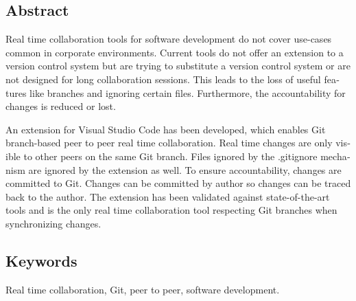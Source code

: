 
\begin{otherlanguage}{english}

  \chapter*{Abstract}

  Real time collaboration tools for software development do not cover use-cases common in corporate environments. Current tools do not offer an extension to a version control system but are trying to substitute a version control system or are not designed for long collaboration sessions. This leads to the loss of useful features like branches and ignoring certain files. Furthermore, the accountability for changes is reduced or lost.

  An extension for Visual Studio Code has been developed, which enables Git branch-based peer to peer real time collaboration. Real time changes are only visible to other peers on the same Git branch. Files ignored by the .gitignore mechanism are ignored by the extension as well. To ensure accountability, changes are committed to Git. Changes can be committed by author so changes can be traced back to the author. The extension has been validated against state-of-the-art tools and is the only real time collaboration tool respecting Git branches when synchronizing changes.

  \bigskip

  \section*{Keywords}
  Real time collaboration, Git, peer to peer, software development.

\end{otherlanguage}
